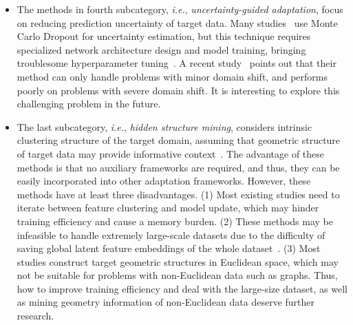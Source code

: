 \documentclass[10pt,journal,compsoc]{IEEEtran}
\def\ie{{\em i.e.}}
\begin{document}
\begin{itemize}[leftmargin=*]
\item The methods in fourth subcategory, \ie, \emph{uncertainty-guided adaptation}, focus on reducing prediction uncertainty of target data.
Many studies~\cite{chen2021source, xu2022denoising} use Monte Carlo Dropout for uncertainty estimation, but this technique requires specialized network architecture design and model training, bringing troublesome hyperparameter tuning~\cite{gal2017concrete}.
A recent study~\cite{chen2021source} points out that their method can only handle problems with minor domain shift, and performs poorly on problems with severe domain shift.
It is interesting to explore this challenging problem in the future.


\item The last subcategory, \ie, \emph{hidden structure mining}, considers intrinsic clustering structure of the target domain, assuming that geometric structure of target data may provide informative context~\cite{tang2021nearest}.
The advantage of these methods is that no auxiliary frameworks are required, and thus, they can be easily incorporated into other adaptation frameworks.
However, these methods have at least three disadvantages.
(1) Most existing studies need to iterate between feature clustering and model update, which may hinder training efficiency and cause a memory burden.
(2) These methods may be infeasible to handle extremely large-scale datasets due to the difficulty of saving global latent feature embeddings of the whole dataset~\cite{chen2020unsupervisedre}.
(3) Most studies construct target geometric structures in Euclidean space, which may not be suitable for problems with non-Euclidean data such as graphs. %
Thus, how to improve training efficiency and deal with the large-size dataset, as well as mining geometry information of non-Euclidean data deserve further research. %
\end{itemize}
\end{document}
